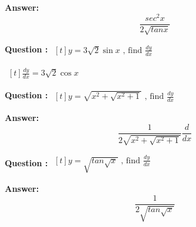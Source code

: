 \documentclass{beamer}
\begin{document}

\frame
{
\textbf{Answer:}
\begin{equation} \nonumber
\frac{sec^2x}{2\sqrt{tan x}}
\end{equation}

}




\frame
{
\textbf{Question :} 
$\begin{aligned}[t] 
y= 3\sqrt{2}\sin x  \text{\ , \  \ find \ \  } \frac{dy}{dx}
\end{aligned}$
}


\frame
{
$\begin{aligned}[t] 
 \frac{dy}{dx}= 3\sqrt{2}\cos x 
\end{aligned}$

}


\frame
{
\textbf{Question :} 
$\begin{aligned}[t] 
y= \sqrt{x^2 + \sqrt{x^2 +1}}  \text{\ , \  \ find \ \  } \frac{dy}{dx}
\end{aligned}$
}


\frame
{
\textbf{Answer:}
\begin{equation} \nonumber
\frac{1}{2\sqrt{x^2 + \sqrt{x^2 +1}}} \frac{d }{dx}
\end{equation}

}



\frame
{
\textbf{Question :} 
$\begin{aligned}[t] 
y= \sqrt{tan \sqrt{x} }  \text{\ , \  \ find \ \  } \frac{dy}{dx}
\end{aligned}$
}


\frame
{
\textbf{Answer:}
\begin{equation} \nonumber
\frac{1}{2\sqrt{tan \sqrt{x} }}
\end{equation}

}

\end{document}

